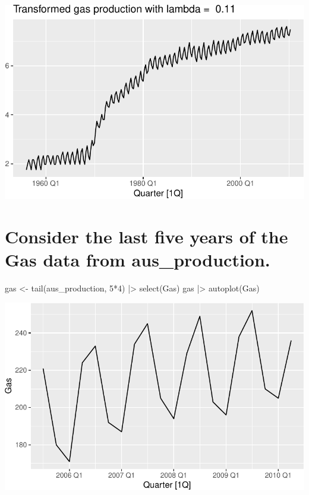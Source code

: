 \documentclass[
  letterpaper,
  DIV=11,
  numbers=noendperiod]{scrartcl}
\newenvironment{Shaded}{\begin{snugshade}}{\end{snugshade}}
\newcommand{\DecValTok}[1]{\textcolor[rgb]{0.68,0.00,0.00}{#1}}
\newcommand{\FunctionTok}[1]{\textcolor[rgb]{0.28,0.35,0.67}{#1}}
\newcommand{\NormalTok}[1]{\textcolor[rgb]{0.00,0.23,0.31}{#1}}
\newcommand{\OtherTok}[1]{\textcolor[rgb]{0.00,0.23,0.31}{#1}}
\newcommand{\SpecialCharTok}[1]{\textcolor[rgb]{0.37,0.37,0.37}{#1}}
\begin{document}
\includegraphics{HW2_IBM6520_files/figure-pdf/unnamed-chunk-5-1.pdf}

\section{Consider the last five years of the Gas data from
aus\_production.}\label{consider-the-last-five-years-of-the-gas-data-from-aus_production.}

\begin{Shaded}
\begin{Highlighting}[]
\NormalTok{gas }\OtherTok{\textless{}{-}} \FunctionTok{tail}\NormalTok{(aus\_production, }\DecValTok{5}\SpecialCharTok{*}\DecValTok{4}\NormalTok{) }\SpecialCharTok{|\textgreater{}} \FunctionTok{select}\NormalTok{(Gas)}
\NormalTok{gas }\SpecialCharTok{|\textgreater{}}
    \FunctionTok{autoplot}\NormalTok{(Gas)}
\end{Highlighting}
\end{Shaded}

\includegraphics{HW2_IBM6520_files/figure-pdf/unnamed-chunk-6-1.pdf}
\end{document}

